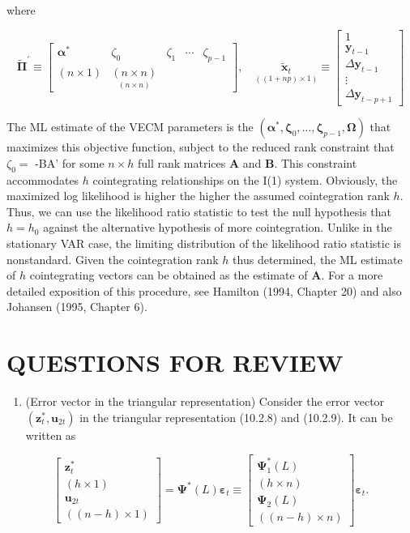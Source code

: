 \documentclass[10pt]{article}
\begin{document}
where

\[
\widetilde{\boldsymbol{\Pi}}^{\prime} \equiv\left[\begin{array}{ccccc}
\boldsymbol{\alpha}^{*} & \zeta_{0} & \zeta_{1} & \cdots & \zeta_{p-1}  \tag{10.2.38}\\
(n \times 1) & \underset{(n \times n)}{(n \times n)}
\end{array}\right], \quad \underset{((1+n p) \times 1)}{\tilde{\mathbf{x}}_{t}} \equiv\left[\begin{array}{c}
1 \\
\mathbf{y}_{t-1} \\
\Delta \mathbf{y}_{t-1} \\
\vdots \\
\Delta \mathbf{y}_{t-p+1}
\end{array}\right]
\]

The ML estimate of the VECM parameters is the $\left(\boldsymbol{\alpha}^{*}, \boldsymbol{\zeta}_{0}, \ldots, \boldsymbol{\zeta}_{p-1}, \boldsymbol{\Omega}\right)$ that maximizes this objective function, subject to the reduced rank constraint that $\zeta_{0}=$ -BA' for some $n \times h$ full rank matrices $\mathbf{A}$ and $\mathbf{B}$. This constraint accommodates $h$ cointegrating relationships on the I(1) system. Obviously, the maximized log likelihood is higher the higher the assumed cointegration rank $h$. Thus, we can use the likelihood ratio statistic to test the null hypothesis that $h=h_{0}$ against the alternative hypothesis of more cointegration. Unlike in the stationary VAR case, the limiting distribution of the likelihood ratio statistic is nonstandard. Given the cointegration rank $h$ thus determined, the ML estimate of $h$ cointegrating vectors can be obtained as the estimate of $\mathbf{A}$. For a more detailed exposition of this procedure, see Hamilton (1994, Chapter 20) and also Johansen (1995, Chapter 6).

\section*{QUESTIONS FOR REVIEW}
\begin{enumerate}
  \item (Error vector in the triangular representation) Consider the error vector $\left(\mathbf{z}_{t}^{*}, \mathbf{u}_{2 t}\right)$ in the triangular representation (10.2.8) and (10.2.9). It can be written as
\end{enumerate}

\[
\left[\begin{array}{c}
\mathbf{z}_{t}^{*}  \tag{10.2.39}\\
(h \times 1) \\
\mathbf{u}_{2 t} \\
((n-h) \times 1)
\end{array}\right]=\boldsymbol{\Psi}^{*}(L) \boldsymbol{\varepsilon}_{t} \equiv\left[\begin{array}{c}
\boldsymbol{\Psi}_{1}^{*}(L) \\
(h \times n) \\
\boldsymbol{\Psi}_{2}(L) \\
((n-h) \times n)
\end{array}\right] \boldsymbol{\varepsilon}_{t} .
\]
\end{document}
